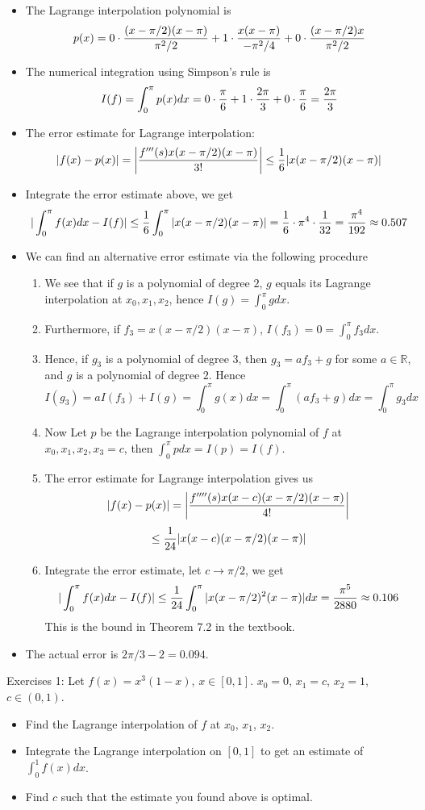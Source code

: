 \documentclass[20pt]{article} %
\theoremstyle{break}
\begin{document}
      \begin{itemize}
      \item The Lagrange interpolation polynomial is
        \[p(x)=0\cdot {(x-\pi/2)(x-\pi)\over \pi^2/2}+1\cdot {x(x-\pi)\over -\pi^2/4}+0\cdot {(x-\pi/2)x\over \pi^2/2}\]
      \item The numerical integration using Simpson's rule is
        \[I(f)=\int_0^\pi p(x)dx=0\cdot {\pi\over 6}+1\cdot {2\pi\over 3}+0\cdot {\pi\over 6}={2\pi\over 3}\]
      \item The error estimate for Lagrange interpolation:
        \[|f(x)-p(x)|=\left|{f'''(s)x(x-{\pi/2})(x-\pi)\over 3!}\right|\leq {1\over 6}|x(x-\pi/2)(x-\pi)|\]
      \item Integrate the error estimate above, we get
        \[|\int_0^\pi f(x)dx-I(f)|\leq {1\over 6}\int_0^\pi|x(x-\pi/2)(x-\pi)|={1\over 6}\cdot \pi^4 \cdot{1\over 32}={\pi^4\over 192}\approx 0.507\]
      \item We can find an alternative error estimate via the following procedure
        \begin{enumerate}
         \item We see that if $g$ is a polynomial of degree $2$, $g$ equals its Lagrange interpolation at $x_0, x_1, x_2$, hence $I(g)=\int_0^\pi gdx$.
         \item Furthermore, if $f_3=x(x-\pi/2)(x-\pi)$, $I(f_3)=0=\int_0^\pi f_3dx$.
         \item Hence, if $g_3$ is a polynomial of degree 3, then $g_3=af_3+g$ for some $a\in\mathbb{R}$, and $g$ is a polynomial of degree $2$. Hence
           \[I(g_3)=aI(f_3)+I(g)=\int_0^\pi g(x)dx=\int_0^\pi (af_3+g)dx=\int_0^\pi g_3dx\]
         \item Now Let $p$ be the Lagrange interpolation polynomial of $f$ at $x_0, x_1, x_2, x_3=c$, then $\int_0^\pi pdx=I(p)=I(f)$.
         \item The error estimate for Lagrange interpolation gives us
           \[|f(x)-p(x)|=\left|{f''''(s)x(x-c)(x-{\pi/2})(x-\pi)\over 4!}\right|\]
           \[\leq {1\over 24}|x(x-c)(x-\pi/2)(x-\pi)|\]
         \item Integrate the error estimate, let $c\rightarrow {\pi/2}$, we get
           \[|\int_0^\pi f(x)dx-I(f)|\leq {1\over 24}\int_0^\pi |x(x-\pi/2)^2(x-\pi)| dx={\pi^5\over 2880}\approx 0.106\]
           This is the bound in Theorem 7.2 in the textbook.
         \end{enumerate}
       \item The actual error is $2\pi/3-2=0.094$.
      \end{itemize}
      \newpage
      Exercises 1: Let $f(x)=x^3(1-x)$, $x\in [0, 1]$. $x_0=0$, $x_1=c$, $x_2=1$, $c\in (0, 1)$.
      \begin{itemize}
      \item Find the Lagrange interpolation of $f$ at $x_0$, $x_1$, $x_2$.
      \item Integrate the Lagrange interpolation on $[0, 1]$ to get an estimate of $\int_0^1f(x)dx$. 
      \item Find $c$ such that the estimate you found above is optimal.
      \end{itemize}
      
\end{document}
